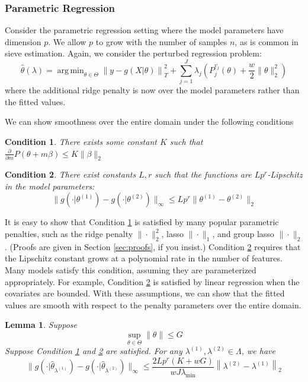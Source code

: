 \documentclass[12pt]{article}
\newtheorem{lemma}{Lemma}
\newtheorem{condition}{Condition}
\DeclareMathOperator*{\argmin}{arg\,min}
\begin{document}
\subsubsection{Parametric Regression}
Consider the parametric regression setting where the model parameters have dimension $p$. We allow $p$ to grow with the number of samples $n$, as is common in sieve estimation. Again, we consider the perturbed regression problem:
\begin{equation}
\hat{\theta}(\lambda) = \argmin_{\theta \in \Theta} 
\left  \| y -  g(X| \theta) \right \|^2_T 
+ \sum_{j=1}^J \lambda_j \left ( P^{v_j}_j(\theta) + \frac{w}{2} \| \theta \|^2_2 \right )
\end{equation}
where the additional ridge penalty is now over the model parameters rather than the fitted values.

We can show smoothness over the entire domain under the following conditions
\begin{condition}
\label{condn:param1}
There exists some constant $K$ such that
$\frac{\partial}{\partial m}P(\theta + m \beta) \le K \|\beta\|_{2}$
\end{condition}
\begin{condition}
\label{condn:param2}
There exist constants $L, r$ such that the functions are $Lp^r$-Lipschitz in the model parameters:
\begin{equation}
\|g(\cdot|\theta^{(1)})-g(\cdot|\theta^{(2)})\|_{\infty}\le Lp^{r}\|\theta^{(1)}-\theta^{(2)}\|_{2}
\end{equation}
\end{condition}

It is easy to show that Condition \ref{condn:param1} is satisfied by many popular parametric penalties, such as the ridge penalty $\| \cdot \|_2^2$, lasso $\| \cdot \|_1$, and group lasso $\| \cdot \|_2$. (Proofs are given in Section \ref{sec:proofs}, if you insist.) Condition \ref{condn:param2} requires that the Lipschitz constant grows at a polynomial rate in the number of features. Many models satisfy this condition, assuming they are parameterized appropriately. For example, Condition \ref{condn:param2} is satisfied by linear regression when the covariates are bounded. With these assumptions, we can show that the fitted values are smooth with respect to the penalty parameters over the entire domain.

\begin{lemma}
\label{lemma:parametric}
Suppose
\[
\sup_{\theta\in\Theta}\|\theta\|\le G
\]
Suppose Condition \ref{condn:param1} and \ref{condn:param2} are satisfied.
For any $\lambda^{(1)}, \lambda^{(2)} \in \Lambda$, we have
\[
\|g(\cdot|\hat{\theta}_{\lambda^{(1)}})-g(\cdot|\hat{\theta}_{\lambda^{(2)}})\|_{\infty}
\le
\frac{2Lp^{r}\left(K+wG\right)}{wJ\lambda_{\min}} 
\left \|\lambda^{(2)}-\lambda^{(1)} \right \|_{2}
\]
\end{lemma}
\end{document}
